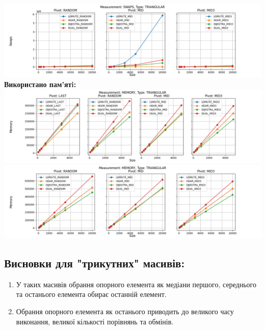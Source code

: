 \documentclass{article}
\begin{document}
        \includegraphics[scale=0.5]{triangular_Swaps_3_pivots_7_numbers.png}
        \newline
    \newpage
    \textbf{Використано пам’ятi:}
    \newline
        \includegraphics[scale=0.5]{triangular_Memory_6_numbers.png}
        \includegraphics[scale=0.5]{triangular_Memory_3_pivots_7_numbers.png}
    \subsection{Висновки для "трикутних" масивів:}
    \begin{enumerate}
        \item У таких масивів обрання опорного елемента як медіани першого, середнього та останього елемента обирає останній елемент.
        \item Обрання опорного елемента як останього приводить до великого часу виконання, великої кількості порівнянь та обмінів.
    \end{enumerate}
    \newpage
\end{document}
